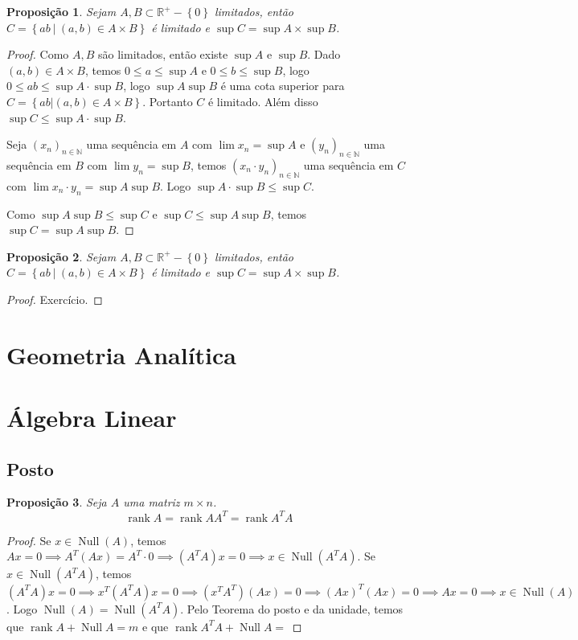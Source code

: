 \documentclass{article}
\theoremstyle{plain}
\newtheorem{prop}{Proposição}[section]
\theoremstyle{definition}
\theoremstyle{remark}
\DeclareMathOperator{\rank}{rank}
\DeclareMathOperator{\Null}{Null}
\begin{document}
\begin{prop}
	Sejam $A,B\subset \mathbb{R}^{+}-\left\{0\right\}$ limitados, então $C = \left\{ ab \: | \: (a,b) \in A\times B \right\}$ é limitado e $\sup C = \sup A \times \sup B$.
\end{prop}
\begin{proof}
	Como $A,B$ são limitados, então existe $\sup A$ e $\sup B$.
	Dado $(a,b) \in A\times B$, temos $ 0 \leq a \leq \sup A $ e $0\leq b \leq \sup B$, logo $0\leq ab \leq \sup A\cdot \sup B$, logo $\sup A \sup B$ é uma cota superior para $ C = \left\{ ab | (a,b) \in A\times B \right\}$. Portanto $C$ é limitado.  Além disso $\sup C  \leq \sup A \cdot \sup B$.


	Seja $(x_n)_{n\in \mathbb{N}}$ uma sequência em $A$ com $\lim x_n = \sup A$ e $(y_n)_{n\in \mathbb{N}}$ uma sequência em $B$ com $\lim y_n = \sup B$, temos $(x_n\cdot y_n)_{n \in \mathbb{N}}$ uma sequência em $C$ com $\lim x_n \cdot y_n = \sup A \sup B$. Logo $\sup A \cdot \sup B  \leq \sup C$.


	Como $\sup A \sup B \leq \sup C$ e $\sup C \leq \sup A \sup B$, temos $\sup C = \sup A \sup B$.

\end{proof}
\begin{prop}
	Sejam $A,B\subset \mathbb{R}^{+}-\left\{0\right\}$ limitados, então $C = \left\{ ab \: | \: (a,b) \in A\times B \right\}$ é limitado e $\sup C = \sup A \times \sup B$.
\end{prop}
\begin{proof}
	Exercício. %
\end{proof}



\section{Geometria Analítica}
\section{Álgebra Linear}
\subsection{Posto}
\begin{prop}
	Seja $A$ uma matriz $m\times n$.
	$$\rank{A} = \rank{A A^T} = \rank{A^T A}$$
\end{prop}
\begin{proof}
	Se $x\in \Null(A)$, temos $Ax = 0 \implies A^T (Ax) = A^T \cdot 0 \implies (A^T A) x = 0 \implies x \in \Null(A^T A)$. Se $x\in \Null(A^T A)$, temos $(A^T A)x = 0 \implies x^T (A^T A) x = 0 \implies (x^TA^T)(Ax) = 0 \implies  (Ax)^T (Ax) = 0 \implies Ax = 0 \implies x \in \Null(A)$. Logo $\Null(A) = \Null(A^T A)$. Pelo Teorema do posto e da unidade, temos que $\rank A + \Null A = m$ e que $\rank A^TA +\Null A = $ %
\end{proof}
\end{document}
